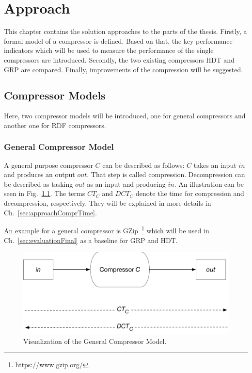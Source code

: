 \chapter{Approach}\label{ch:approach}

This chapter contains the solution approaches to the parts of the thesis. Firstly, a formal model of a compressor is defined. Based on that, the key performance indicators which will be used to measure the performance of the single compressors are introduced. Secondly, the two existing compressors HDT and GRP are compared. Finally, improvements of the compression will be suggested.


\section{Compressor Models}

Here, two compressor models will be introduced, one for general compressors and another one for RDF compressors. 

\subsection{General Compressor Model}\label{sec:generalcompressorModel}

A general purpose compressor $C$ can be described as follows: $C$ takes an input $in$ and produces an output $out$. That step is called compression. Decompression can be described as tasking $out$ as an input and producing $in$. An illustration can be seen in Fig.~\ref{fig:generalcompressorModel}. The terms $CT_C$ and $DCT_C$ denote the time for compression and decompression, respectively. They will be explained in more details in Ch.~\ref{sec:approachComprTime}.

An example for a general compressor is GZip~\footnote{https://www.gzip.org/} which will be used in Ch.~\ref{sec:evaluationFinal} as a baseline for GRP and HDT.

\begin{figure}
	\centering
	\includegraphics[width=0.8\linewidth]{figures/approach/model_general}
	\caption{Visualization of the General Compressor Model.}
	\label{fig:generalcompressorModel}
\end{figure}

